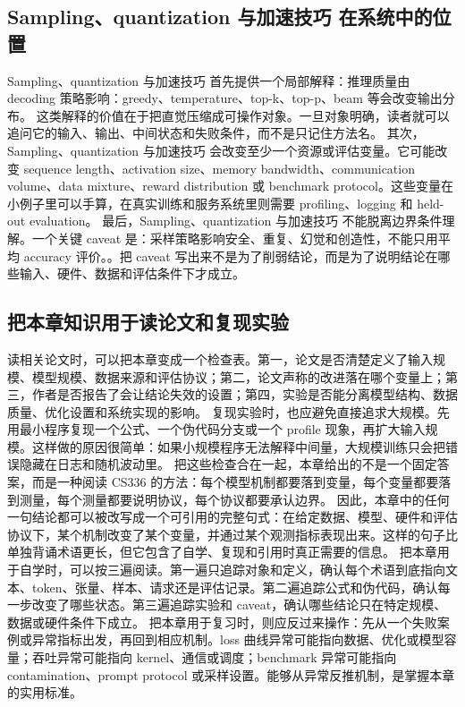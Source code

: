 \documentclass[a4paper]{article}
\begin{document}
\subsection{Sampling、quantization 与加速技巧 在系统中的位置}
Sampling、quantization 与加速技巧 首先提供一个局部解释：推理质量由 decoding 策略影响：greedy、temperature、top-k、top-p、beam 等会改变输出分布。 这类解释的价值在于把直觉压缩成可操作对象。一旦对象明确，读者就可以追问它的输入、输出、中间状态和失败条件，而不是只记住方法名。
其次，Sampling、quantization 与加速技巧 会改变至少一个资源或评估变量。它可能改变 sequence length、activation size、memory bandwidth、communication volume、data mixture、reward distribution 或 benchmark protocol。这些变量在小例子里可以手算，在真实训练和服务系统里则需要 profiling、logging 和 held-out evaluation。
最后，Sampling、quantization 与加速技巧 不能脱离边界条件理解。一个关键 caveat 是：采样策略影响安全、重复、幻觉和创造性，不能只用平均 accuracy 评价。。把 caveat 写出来不是为了削弱结论，而是为了说明结论在哪些输入、硬件、数据和评估条件下才成立。
\subsection{把本章知识用于读论文和复现实验}
读相关论文时，可以把本章变成一个检查表。第一，论文是否清楚定义了输入规模、模型规模、数据来源和评估协议；第二，论文声称的改进落在哪个变量上；第三，作者是否报告了会让结论失效的设置；第四，实验是否能分离模型结构、数据质量、优化设置和系统实现的影响。
复现实验时，也应避免直接追求大规模。先用最小程序复现一个公式、一个伪代码分支或一个 profile 现象，再扩大输入规模。这样做的原因很简单：如果小规模程序无法解释中间量，大规模训练只会把错误隐藏在日志和随机波动里。
把这些检查合在一起，本章给出的不是一个固定答案，而是一种阅读 CS336 的方法：每个模型机制都要落到变量，每个变量都要落到测量，每个测量都要说明协议，每个协议都要承认边界。
因此，本章中的任何一句结论都可以被改写成一个可引用的完整句式：在给定数据、模型、硬件和评估协议下，某个机制改变了某个变量，并通过某个观测指标表现出来。这样的句子比单独背诵术语更长，但它包含了自学、复现和引用时真正需要的信息。
把本章用于自学时，可以按三遍阅读。第一遍只追踪对象和定义，确认每个术语到底指向文本、token、张量、样本、请求还是评估记录。第二遍追踪公式和伪代码，确认每一步改变了哪些状态。第三遍追踪实验和 caveat，确认哪些结论只在特定规模、数据或硬件条件下成立。
把本章用于复习时，则应反过来操作：先从一个失败案例或异常指标出发，再回到相应机制。loss 曲线异常可能指向数据、优化或模型容量；吞吐异常可能指向 kernel、通信或调度；benchmark 异常可能指向 contamination、prompt protocol 或采样设置。能够从异常反推机制，是掌握本章的实用标准。
\end{document}
